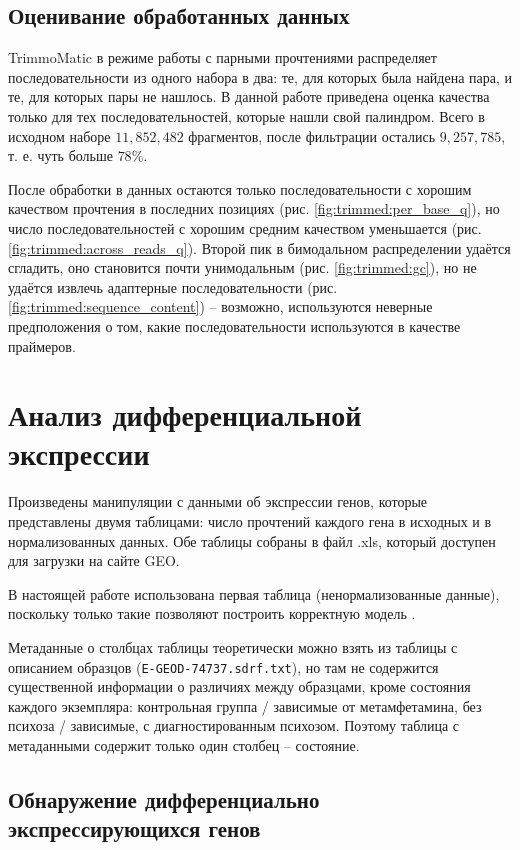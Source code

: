 \documentclass[a4paper,12pt]{article}
\begin{document}
\subsection{Оценивание обработанных данных}

TrimmoMatic в режиме работы с парными прочтениями распределяет последовательности из одного набора в два: те, для которых была найдена пара, и те, для которых пары не нашлось.
В данной работе приведена оценка качества только для тех последовательностей, которые нашли свой палиндром.
Всего в исходном наборе $ 11, 852, 482 $ фрагментов, после фильтрации остались $ 9, 257, 785 $, т. е. чуть больше $ 78\% $.

После обработки в данных остаются только последовательности с хорошим качеством прочтения в последних позициях (рис. \ref{fig:trimmed:per_base_q}), но число последовательностей с хорошим средним качеством уменьшается (рис. \ref{fig:trimmed:across_reads_q}).
Второй пик в бимодальном распределении удаётся сгладить, оно становится почти унимодальным (рис. \ref{fig:trimmed:gc}), но не удаётся извлечь адаптерные последовательности (рис. \ref{fig:trimmed:sequence_content}) -- возможно, используются неверные предположения о том, какие последовательности используются в качестве праймеров.

\section{Анализ дифференциальной экспрессии}

Произведены манипуляции с данными об экспрессии генов, которые представлены двумя таблицами: число прочтений каждого гена в исходных и в нормализованных данных.
Обе таблицы собраны в файл .xls, который доступен для загрузки на сайте GEO.

В настоящей работе использована первая таблица (ненормализованные данные), поскольку только такие позволяют построить корректную модель \cite{love2014}.

Метаданные о столбцах таблицы теоретически можно взять из таблицы с описанием образцов (\texttt{E-GEOD-74737.sdrf.txt}), но там не содержится существенной информации о различиях между образцами, кроме состояния каждого экземпляра: контрольная группа / зависимые от метамфетамина, без психоза / зависимые, с диагностированным психозом.
Поэтому таблица с метаданными содержит только один столбец -- состояние. \\

\subsection{Обнаружение дифференциально экспрессирующихся генов}
\end{document}
